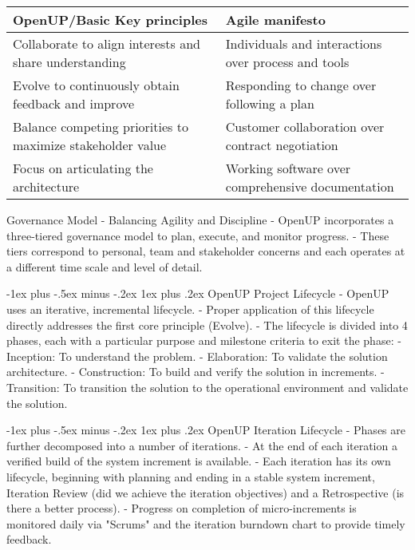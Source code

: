 \documentclass[a4paper]{article}
\makeatletter
\renewcommand{\subsubsection}{\@startsection{subsubsection}{3}{0mm}%
                                {-1ex plus -.5ex minus -.2ex}%
                                {1ex plus .2ex}%
                                {\normalfont\small\bfseries}}
\makeatother
\begin{document}
\begin{multicols}{3}
  \begin{tabular}{l|l}
  OpenUP/Basic Key principles                                & Agile manifesto                                     \\\hline
  Collaborate to align interests and share understanding     & Individuals and interactions over process and tools \\
  Evolve to continuously obtain feedback and improve         & Responding to change over following a plan          \\
  Balance competing priorities to maximize stakeholder value & Customer collaboration over contract negotiation    \\
  Focus on articulating the architecture                     & Working software over comprehensive documentation   \\
  \end{tabular}
  
  Governance Model - Balancing Agility and Discipline
  - OpenUP incorporates a three-tiered governance model to plan, execute, and monitor progress.
  - These tiers correspond to personal, team and stakeholder concerns and each operates at a different time scale and level of detail.
  
  \subsubsection{OpenUP Project Lifecycle}
  - OpenUP uses an iterative, incremental lifecycle.
  - Proper application of this lifecycle directly addresses the first core principle (Evolve).
  - The lifecycle is divided into 4 phases, each with a particular purpose and milestone criteria to exit the phase:
         - Inception: To understand the problem.
         - Elaboration: To validate the solution architecture.
         - Construction: To build and verify the solution in increments.
         - Transition: To transition the solution to the operational environment and validate the solution.
  
  \subsubsection{OpenUP Iteration Lifecycle}
  - Phases are further decomposed into a number of iterations.
  - At the end of each iteration a verified build of the system increment is available.
  - Each iteration has its own lifecycle, beginning with planning and ending in a stable system increment, Iteration Review (did we achieve the iteration objectives) and a Retrospective (is there a better process).
  - Progress on completion of micro-increments is monitored daily via "Scrums" and the iteration burndown chart to provide timely feedback.
  

\end{multicols}
\end{document}
